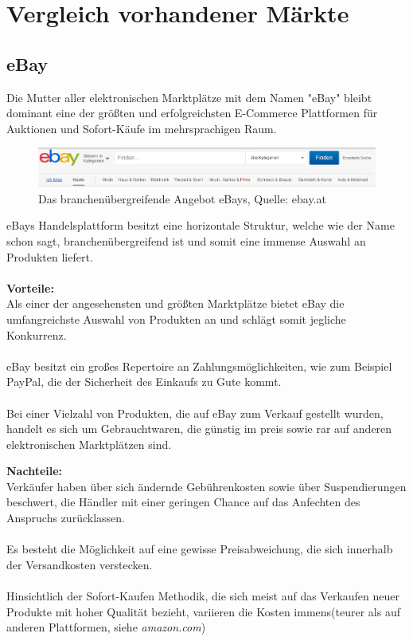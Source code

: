 \documentclass[11pt,a4paper]{article}
\begin{document}
\section{Vergleich vorhandener Märkte}

\subsection{eBay}

Die Mutter aller elektronischen Marktplätze mit dem Namen "eBay" bleibt dominant eine der größten und erfolgreichsten E-Commerce Plattformen für Auktionen und Sofort-Käufe im mehrsprachigen Raum.

\begin{figure}[ht!]
	\centering
	\includegraphics[width=180mm]{ebay}
	\caption{Das branchenübergreifende Angebot eBays, Quelle: ebay.at \label{ebay}}
\end{figure}

\noindent eBays Handelsplattform besitzt eine horizontale Struktur, welche wie der Name schon sagt, branchenübergreifend ist und somit eine immense Auswahl an Produkten liefert. \\ \\

\noindent \textbf{Vorteile:} \\ 
Als einer der angesehensten und größten Marktplätze bietet eBay die umfangreichste Auswahl von Produkten an und schlägt somit jegliche Konkurrenz. \\ \\
eBay besitzt ein großes Repertoire an Zahlungsmöglichkeiten, wie zum Beispiel PayPal, die der Sicherheit des Einkaufs zu Gute kommt.
\\ \\
Bei einer Vielzahl von Produkten, die auf eBay zum Verkauf gestellt wurden, handelt es sich um Gebrauchtwaren, die günstig im preis sowie rar auf anderen elektronischen Marktplätzen sind.

\noindent \textbf{Nachteile:} \\
Verkäufer haben über sich ändernde Gebührenkosten sowie über Suspendierungen beschwert, die Händler mit einer geringen Chance auf das Anfechten des Anspruchs zurücklassen.\\ \\
Es besteht die Möglichkeit auf eine gewisse Preisabweichung, die sich innerhalb der Versandkosten verstecken. \\ \\
Hinsichtlich der Sofort-Kaufen Methodik, die sich meist auf das Verkaufen neuer Produkte mit hoher Qualität bezieht, variieren die Kosten immens(teurer als auf anderen Plattformen, siehe \textit{amazon.com})
\end{document}
